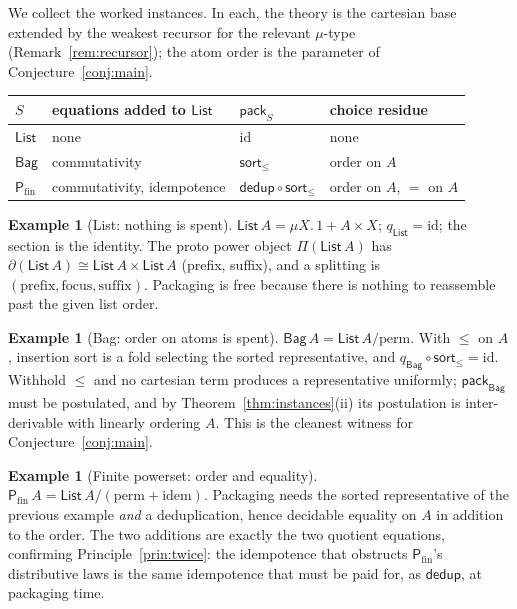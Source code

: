 \documentclass[11pt]{article}
\theoremstyle{definition}
\newtheorem{example}[definition]{Example}
\theoremstyle{plain}
\newcommand{\p}{\partial}
\newcommand{\Coll}{S}
\newcommand{\List}{\mathsf{List}}
\newcommand{\Mset}{\mathsf{Bag}}
\newcommand{\Pfin}{\mathsf{P}_{\mathrm{fin}}}
\newcommand{\pack}{\mathsf{pack}}
\newcommand{\Proto}{\Pi}
\newcommand{\id}{\mathrm{id}}
\newcommand{\qmap}{q}
\begin{document}
We collect the worked instances. In each, the theory is the cartesian base
extended by the weakest recursor for the relevant $\mu$-type
(Remark~\ref{rem:recursor}); the atom order is the parameter of
Conjecture~\ref{conj:main}.

\begin{center}
\renewcommand{\arraystretch}{1.35}
\begin{tabular}{@{}llll@{}}
\hline
$\Coll$ & equations added to $\List$ & $\pack_{\Coll}$ & choice residue \\
\hline
$\List$  & none                       & $\id$                                   & none \\
$\Mset$  & commutativity              & $\mathsf{sort}_{\le}$                   & order on $A$ \\
$\Pfin$  & commutativity, idempotence & $\mathsf{dedup}\circ\mathsf{sort}_{\le}$ & order on $A$, $=$ on $A$ \\
\hline
\end{tabular}
\end{center}

\begin{example}[List: nothing is spent]
$\List\,A = \mu X.\,1 + A\times X$; $\qmap_{\List}=\id$; the section is the
identity. The proto power object $\Proto(\List\,A)$ has $\p(\List\,A) \cong
\List\,A \times \List\,A$ (prefix, suffix), and a splitting is
$(\text{prefix},\text{focus},\text{suffix})$. Packaging is free because there
is nothing to reassemble past the given list order.
\end{example}

\begin{example}[Bag: order on atoms is spent]
$\Mset\,A = \List\,A/\text{perm}$. With $\le$ on $A$, insertion sort is a fold
selecting the sorted representative, and $\qmap_{\Mset}\circ\mathsf{sort}_{\le}
= \id$. Withhold $\le$ and no cartesian term produces a representative
uniformly; $\pack_{\Mset}$ must be postulated, and by Theorem~\ref{thm:instances}(ii)
its postulation is inter-derivable with linearly ordering $A$. This is the
cleanest witness for Conjecture~\ref{conj:main}.
\end{example}

\begin{example}[Finite powerset: order and equality]
$\Pfin\,A = \List\,A/(\text{perm}+\text{idem})$. Packaging needs the sorted
representative of the previous example \emph{and} a deduplication, hence
decidable equality on $A$ in addition to the order. The two additions are
exactly the two quotient equations, confirming Principle~\ref{prin:twice}: the
idempotence that obstructs $\Pfin$'s distributive laws is the same idempotence
that must be paid for, as $\mathsf{dedup}$, at packaging time.
\end{example}
\end{document}
